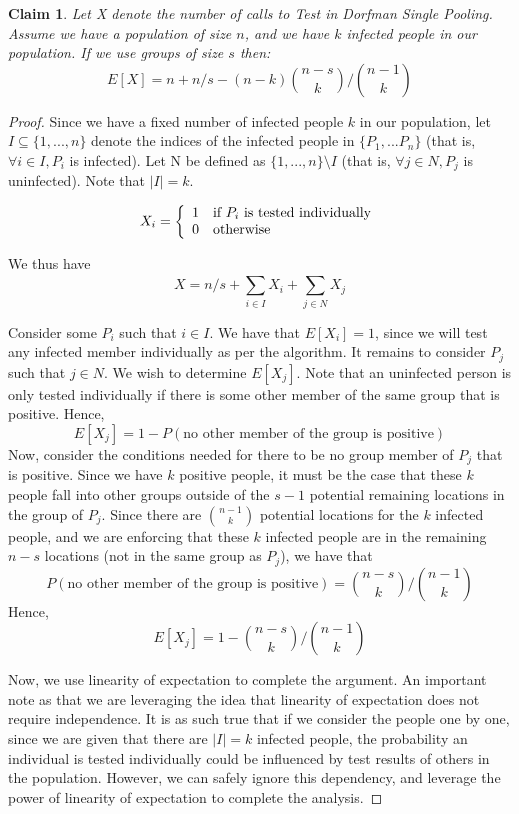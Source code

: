 \documentclass[12pt]{article}
\newtheorem{claim}[theorem]{Claim}
\begin{document}
\begin{claim}
Let X denote the number of calls to {\sf Test} in Dorfman Single Pooling. Assume we have a population of size $n$, and we have $k$ infected people in our population. If we use groups of size $s$ then: $$E[X]= n+n/s-(n-k){n-s \choose k}/{n-1 \choose k} $$

\end{claim}

\begin{proof}

Since we have a fixed number of infected people $k$ in our population, let $I \subseteq \{1,...,n\}$ denote the indices of the infected people in $\{P_1,...P_n\}$  (that is, $\forall i \in I, P_i$ is infected). Let N be defined as $\{1,...,n\} \setminus I$ (that is, $\forall j \in N, P_j$ is uninfected). Note that $|I|=k$.


\begin{equation}
X_i = \left\lbrace
\begin{array}{r l}
1 & \mbox{if }P_i \mbox{ is tested individually} \\
0 & \mbox{otherwise}
\end{array}
\right.
\label{eqn:abs}
\end{equation}

We thus have $$X=n/s + \sum\limits_{i \in I}^{}X_i + \sum\limits_{j \in N}^{}X_j$$

Consider some $P_i$ such that $i \in I$. We have that $E[X_i]=1$, since we will test any infected member individually as per the algorithm. It remains to consider $P_j$ such that $j \in N$. We wish to determine $E[X_j]$. Note that an uninfected person is only tested individually if there is some other member of the same group that is positive. Hence, $$E[X_j]=1-P(\mbox{no other member of the group is positive})$$
Now, consider the conditions needed for there to be no group member of $P_j$ that is positive. Since we have $k$ positive people, it must be the case that these $k$ people fall into other groups outside of the $s-1$ potential remaining locations in the group of $P_j$. Since there are $n-1 \choose k$ potential locations for the $k$ infected people, and we are enforcing that these $k$ infected people are in the remaining $n-s$ locations (not in the same group as $P_j$), we have that $$P(\mbox{no other member of the group is positive})={n-s \choose k}/{n-1 \choose k}$$ Hence, $$E[X_j]=1-{n-s \choose k}/{n-1 \choose k}$$

Now, we use linearity of expectation to complete the argument. An important note as that we are leveraging the idea that linearity of expectation does not require independence. It is as such true that if we consider the people one by one, since we are given that there are $|I|=k$ infected people, the probability an individual is tested individually could be influenced by test results of others in the population. However, we can safely ignore this dependency, and leverage the power of linearity of expectation to complete the analysis.


\end{proof}
\end{document}
